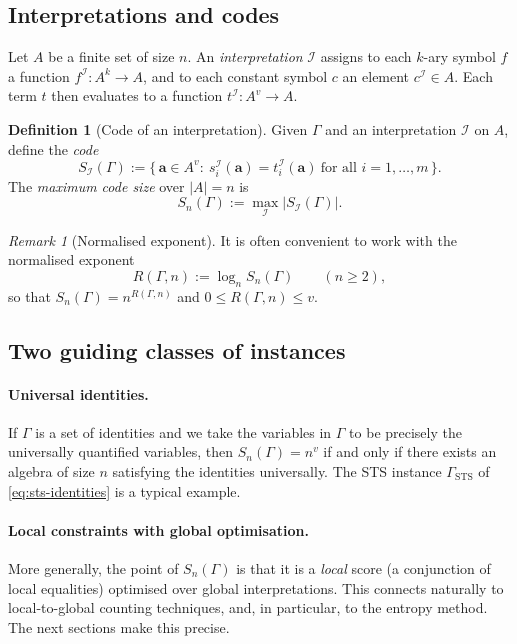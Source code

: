 \documentclass[11pt]{article}
\theoremstyle{plain}
\theoremstyle{definition}
\theoremstyle{definition}
\newtheorem{definition}[theorem]{Definition}
\theoremstyle{remark}
\newtheorem{remark}[theorem]{Remark}
\newcommand{\A}{A}
\newcommand{\Sn}{S_n}
\newcommand{\SI}{S_{\mathcal I}}
\newcommand{\abs}[1]{\left\lvert #1 \right\rvert}
\newcommand{\logn}{\log_n}
\begin{document}
\subsection{Interpretations and codes}

Let $\A$ be a finite set of size $n$.
An \emph{interpretation} $\mathcal I$ assigns to each $k$-ary symbol $f$ a function
$f^{\mathcal I}:\A^k\to \A$, and to each constant symbol $c$ an element $c^{\mathcal I}\in \A$.
Each term $t$ then evaluates to a function $t^{\mathcal I}:\A^v\to \A$.

\begin{definition}[Code of an interpretation]
\label{def:code}
Given $\Gamma$ and an interpretation $\mathcal I$ on $\A$, define the \emph{code}
\[
\SI(\Gamma):=\bigl\{\,\mathbf a\in \A^v:\ s_i^{\mathcal I}(\mathbf a)=t_i^{\mathcal I}(\mathbf a)\ \text{for all }i=1,\dots,m\,\bigr\}.
\]
The \emph{maximum code size} over $\abs{\A}=n$ is
\[
\Sn(\Gamma):=\max_{\mathcal I}\abs{\SI(\Gamma)}.
\]
\end{definition}

\begin{remark}[Normalised exponent]
It is often convenient to work with the normalised exponent
\[
R(\Gamma,n):=\logn \Sn(\Gamma)\qquad (n\ge 2),
\]
so that $\Sn(\Gamma)=n^{R(\Gamma,n)}$ and $0\le R(\Gamma,n)\le v$.
\end{remark}

\subsection{Two guiding classes of instances}

\paragraph{Universal identities.}
If $\Gamma$ is a set of identities and we take the variables in $\Gamma$ to be precisely the universally
quantified variables, then $\Sn(\Gamma)=n^v$ if and only if there exists an algebra of size $n$ satisfying
the identities universally.
The STS instance $\Gamma_{\mathrm{STS}}$ of \eqref{eq:sts-identities} is a typical example.

\paragraph{Local constraints with global optimisation.}
More generally, the point of $\Sn(\Gamma)$ is that it is a \emph{local} score (a conjunction of local equalities)
optimised over global interpretations.
This connects naturally to local-to-global counting techniques, and, in particular, to the entropy method.
The next sections make this precise.
\end{document}
